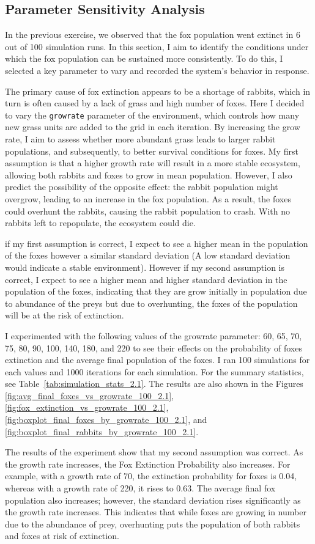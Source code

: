 \subsection{Parameter Sensitivity Analysis }

In the previous exercise, we observed that the fox population went extinct in 6 out of 100 simulation runs. In this section, I aim to identify the conditions under which the fox population can be sustained more consistently. To do this, I selected a key parameter to vary and recorded the system's behavior in response.

The primary cause of fox extinction appears to be a shortage of rabbits, which in turn is often caused by a lack of grass and high number of foxes. Here I decided to vary the \texttt{growrate} parameter of the environment, which controls how many new grass units are added to the grid in each iteration. By increasing the grow rate, I aim to assess whether more abundant grass leads to larger rabbit populations, and subsequently, to better survival conditions for foxes.
My first assumption is that a higher growth rate will result in a more stable ecosystem, allowing both rabbits and foxes to grow in mean population. However, I also predict the possibility of the opposite effect: the rabbit population might overgrow, leading to an increase in the fox population. As a result, the foxes could overhunt the rabbits, causing the rabbit population to crash. With no rabbits left to repopulate, the ecosystem could die.

if my first assumption is correct, I expect to see a higher mean in the population of the foxes however a similar standard deviation (A low standard deviation would indicate a stable environment). However if my second assumption is correct, I expect to see a higher mean and higher standard deviation in the population of the foxes, indicating that they are grow initially in population due to abundance of the preys but due to overhunting, the foxes of the population will be at the risk of extinction.

I experimented with the following values of the growrate parameter: 60, 65, 70, 75, 80, 90, 100, 140, 180, and 220 to
 see their effects on the probability of foxes extinction and the average final population of the foxes. I ran 100
  simulations for each values and 1000 iterations for each simulation.
   For the summary statistics, see Table~\ref{tab:simulation_stats_2.1}. 
   The results are also shown in the Figures \ref{fig:avg_final_foxes_vs_growrate_100_2.1}, \ref{fig:fox_extinction_vs_growrate_100_2.1},
   \ref{fig:boxplot_final_foxes_by_growrate_100_2.1}, and \ref{fig:boxplot_final_rabbits_by_growrate_100_2.1}.

   The results of the experiment show that my second assumption was correct. As the growth rate increases, the Fox Extinction Probability also increases. For example, with a growth rate of 70, the extinction probability for foxes is 0.04, whereas with a growth rate of 220, it rises to 0.63.
   The average final fox population also increases; however, the standard deviation rises significantly as the growth rate increases. This indicates that while foxes are growing in number due to the abundance of prey, overhunting puts the population of both rabbits and foxes at risk of extinction.